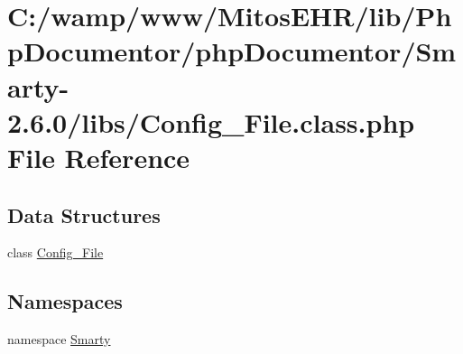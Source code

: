 \hypertarget{_config___file_8class_8php}{\section{\-C\-:/wamp/www/\-Mitos\-E\-H\-R/lib/\-Php\-Documentor/php\-Documentor/\-Smarty-\/2.6.0/libs/\-Config\-\_\-\-File.class.\-php \-File \-Reference}
\label{_config___file_8class_8php}
}
\subsection*{\-Data \-Structures}
\begin{DoxyCompactItemize}
\item 
class \hyperlink{class_config___file}{\-Config\-\_\-\-File}
\end{DoxyCompactItemize}
\subsection*{\-Namespaces}
\begin{DoxyCompactItemize}
\item 
namespace \hyperlink{namespace_smarty}{\-Smarty}
\end{DoxyCompactItemize}
